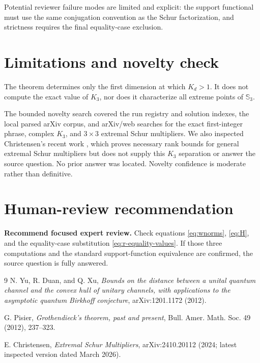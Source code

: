 \documentclass[11pt]{article}
\newcommand{\Sball}{\mathbb S}
\begin{document}
Potential reviewer failure modes are limited and explicit: the support
functional must use the same conjugation convention as the Schur
factorization, and strictness requires the final equality-case exclusion.

\section{Limitations and novelty check}

The theorem determines only the first dimension at which $K_d>1$.  It does
not compute the exact value of $K_3$, nor does it characterize all extreme
points of $\Sball_3$.

The bounded novelty search covered the run registry and solution indexes,
the local parsed arXiv corpus, and arXiv/web searches for the exact
first-integer phrase, complex $K_3$, and $3\times3$ extremal Schur
multipliers.  We also inspected Christensen's recent work
\cite{Christensen}, which proves necessary rank bounds for general extremal
Schur multipliers but does not supply this $K_3$ separation or answer the
source question.  No prior answer was located.  Novelty confidence is
moderate rather than definitive.

\section{Human-review recommendation}

\textbf{Recommend focused expert review.}  Check equations
\eqref{eq:wnorms}, \eqref{eq:H}, and the equality-case substitution
\eqref{eq:r-equality-values}.  If those three computations and the standard
support-function equivalence are confirmed, the source question is fully
answered.

\begin{thebibliography}{9}
N. Yu, R. Duan, and Q. Xu,
\emph{Bounds on the distance between a unital quantum channel and the convex
hull of unitary channels, with applications to the asymptotic quantum
Birkhoff conjecture}, arXiv:1201.1172 (2012).

G. Pisier, \emph{Grothendieck's theorem, past and present},
Bull. Amer. Math. Soc. 49 (2012), 237--323.

E. Christensen, \emph{Extremal Schur Multipliers},
arXiv:2410.20112 (2024; latest inspected version dated March 2026).
\end{thebibliography}
\end{document}
